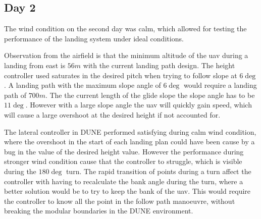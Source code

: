 \subsection{Day 2}
The wind condition on the second day was calm, which allowed for testing the performance of the landing system under ideal conditions.

Observation from the airfield is that the minimum altitude of the \gls{uav} during a landing from east is $56 m$ with the current landing path design. The height controller used saturates in the desired pitch when trying to follow slope at $6 \deg$. A landing path with the maximum slope angle of $6 \deg$ would require a landing path of $700 m$. The the current length of the glide slope the slope angle has to be $11 \deg$. However with a large slope angle the \gls{uav} will quickly gain speed, which will cause a large overshoot at the desired height if not accounted for.

The lateral controller in DUNE performed satisfying during calm wind condition, where the overshoot in the start of each landing plan could have been cause by a bug in the value of the desired height value. However the performance during stronger wind condition cause that the controller to struggle, which is visible during the $180 \deg$ turn. The rapid transition of points during a turn affect the controller with having to recalculate the bank angle during the turn, where a better solution would be to try to keep the bank of the \gls{uav}. This would require the controller to know all the point in the follow path manoeuvre, without breaking the modular boundaries in the DUNE environment.
